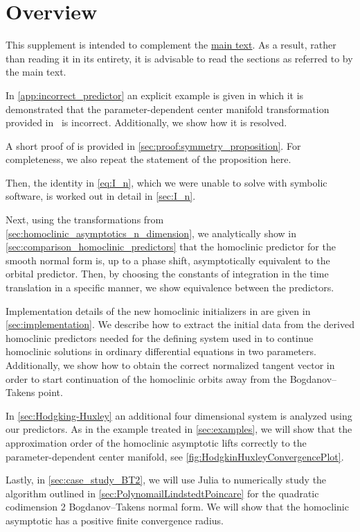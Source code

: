 \section{Overview}
\label{sm:sec:overview}
This supplement is intended to complement the \hyperref[maintext]{main
text}. As a result, rather than reading it in its entirety, it is advisable to
read the sections as referred to by the main text.

In \cref{app:incorrect_predictor} an explicit example is given in which it is
demonstrated that the parameter-dependent center manifold transformation
provided in~\cite{Al-Hdaibat2016} is incorrect. Additionally, we show how it is
resolved.

A short proof of  is provided in
\cref{sec:proof:symmetry_proposition}. For completeness, we also repeat the
statement of the proposition here.

Then, the identity in \cref{eq:I_n}, which we were unable to solve with symbolic
software, is worked out in detail in \cref{sec:I_n}.

Next, using the transformations from
\cref{sec:homoclinic_asymptotics_n_dimension}, we analytically show in
\cref{sec:comparison_homoclinic_predictors} that the homoclinic predictor for
the smooth normal form is, up to a phase shift, asymptotically equivalent to
the orbital predictor. Then, by choosing the constants of integration in the
time translation in a specific manner, we show equivalence between the
predictors.

Implementation details of the new homoclinic initializers in \MATCONT are given
in \cref{sec:implementation}. We describe how to extract the initial data from
the derived homoclinic predictors needed for the defining system used in \MATCONT to
continue homoclinic solutions in ordinary differential equations in two
parameters. Additionally, we show how to obtain the correct normalized tangent
vector in order to start continuation of the homoclinic orbits away from the
Bogdanov--Takens point.

In \cref{sec:Hodgking-Huxley} an additional four dimensional system is
analyzed using our predictors. As in the example treated in \cref{sec:examples},
we will show that the approximation order of the homoclinic asymptotic lifts
correctly to the parameter-dependent center manifold, see
\cref{fig:HodgkinHuxleyConvergencePlot}.

Lastly, in \cref{sec:case_study_BT2}, we will use Julia to numerically study
the algorithm outlined in \cref{sec:PolynomailLindstedtPoincare} for the
quadratic codimension 2 Bogdanov--Takens normal form. We will show that
the homoclinic asymptotic has a positive finite convergence radius.
